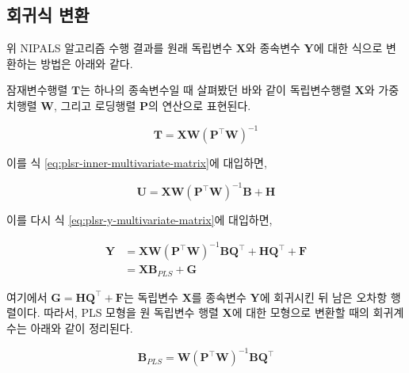 \documentclass[
]{book}
\newenvironment{Shaded}{\begin{snugshade}}{\end{snugshade}}
\newcommand{\FunctionTok}[1]{\textcolor[rgb]{0.00,0.00,0.00}{#1}}
\newcommand{\NormalTok}[1]{#1}
\newcommand{\OtherTok}[1]{\textcolor[rgb]{0.56,0.35,0.01}{#1}}
\newcommand{\SpecialCharTok}[1]{\textcolor[rgb]{0.00,0.00,0.00}{#1}}
\begin{document}
\hypertarget{plsr-multivariate-transform}{%
\subsection{회귀식 변환}\label{plsr-multivariate-transform}}

위 NIPALS 알고리즘 수행 결과를 원래 독립변수 \(\mathbf{X}\)와 종속변수 \(\mathbf{Y}\)에 대한 식으로 변환하는 방법은 아래와 같다.

잠재변수행렬 \(\mathbf{T}\)는 하나의 종속변수일 때 살펴봤던 바와 같이 독립변수행렬 \(\mathbf{X}\)와 가중치행렬 \(\mathbf{W}\), 그리고 로딩행렬 \(\mathbf{P}\)의 연산으로 표현된다.

\begin{equation}
\mathbf{T} = \mathbf{X} \mathbf{W} \left(\mathbf{P}^\top \mathbf{W}\right)^{-1}
\end{equation}

이를 식 \eqref{eq:plsr-inner-multivariate-matrix}에 대입하면,

\begin{equation}
\mathbf{U} = \mathbf{X} \mathbf{W} \left(\mathbf{P}^\top \mathbf{W}\right)^{-1} \mathbf{B} + \mathbf{H}
\end{equation}

이를 다시 식 \eqref{eq:plsr-y-multivariate-matrix}에 대입하면,

\begin{equation}
\begin{split}
\mathbf{Y} &= \mathbf{X} \mathbf{W} \left(\mathbf{P}^\top \mathbf{W}\right)^{-1} \mathbf{B} \mathbf{Q}^\top + \mathbf{H} \mathbf{Q}^\top + \mathbf{F}\\
&= \mathbf{X} \mathbf{B}_{PLS} + \mathbf{G}
\end{split} \label{eq:plsr-multivariate-beta}
\end{equation}

여기에서 \(\mathbf{G} = \mathbf{H} \mathbf{Q}^\top + \mathbf{F}\)는 독립변수 \(\mathbf{X}\)를 종속변수 \(\mathbf{Y}\)에 회귀시킨 뒤 남은 오차항 행렬이다. 따라서, PLS 모형을 원 독립변수 행렬 \(\mathbf{X}\)에 대한 모형으로 변환할 때의 회귀계수는 아래와 같이 정리된다.

\begin{equation}
\mathbf{B}_{PLS} = \mathbf{W} \left(\mathbf{P}^\top \mathbf{W}\right)^{-1} \mathbf{B} \mathbf{Q}^\top
\end{equation}

\begin{Shaded}
\end{Shaded}
\end{document}
